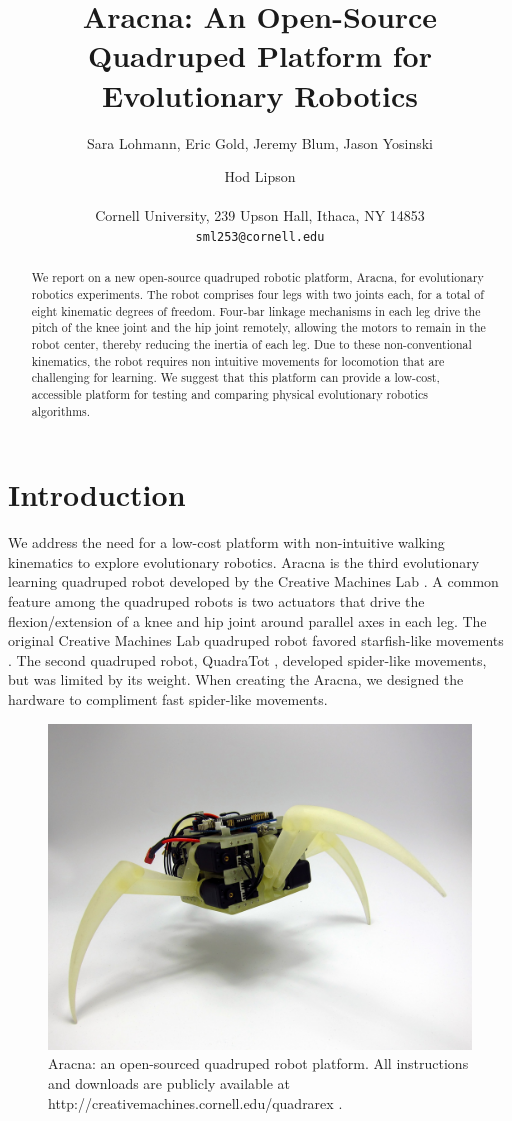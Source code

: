 \documentclass[letterpaper]{article}
\title{Aracna: An Open-Source Quadruped Platform for Evolutionary Robotics}
\author{Sara Lohmann, Eric Gold, Jeremy Blum, Jason Yosinski \and Hod Lipson \\
\mbox{}\\
Cornell University, 239 Upson Hall, Ithaca, NY 14853 \\
\texttt{sml253@cornell.edu}}
\begin{document}
\maketitle

\begin{abstract}
We report on a new open-source quadruped robotic platform, Aracna,
for evolutionary robotics experiments. The robot comprises four legs
with two joints each, for a total of eight kinematic degrees of
freedom. Four-bar linkage mechanisms in each leg drive the pitch of
the knee joint and the hip joint remotely, allowing the motors to
remain in the robot center, thereby reducing the inertia of each
leg. Due to these non-conventional kinematics, the robot requires non
intuitive movements for locomotion that are challenging for
learning. We suggest that this platform can provide a low-cost,
accessible platform for testing and comparing physical evolutionary
robotics algorithms.
\end{abstract}



\section{Introduction}

We address the need for a low-cost platform with non-intuitive walking
kinematics to explore evolutionary robotics. Aracna is the third
evolutionary learning quadruped robot developed by the Creative
Machines Lab \citep{HL, JY}. A common feature among the quadruped
robots is two actuators that drive the flexion/extension of a knee and
hip joint around parallel axes in each leg. The original Creative
Machines Lab quadruped robot favored starfish-like movements
\citep{HL}. The second quadruped robot, QuadraTot \citep{JY},
developed spider-like movements, but was limited by its weight. When
creating the Aracna, we designed the hardware to compliment fast
spider-like movements.

\begin{figure}[t]
\begin{center}
\includegraphics[width=.45\textwidth]{fig1.jpg}
\caption{Aracna: an open-sourced quadruped robot platform. All
  instructions and downloads are publicly available at
  http://creativemachines.cornell.edu/quadrarex \citep{WEB}.}
\label{fig1}
\end{center}
\end{figure}
\end{document}
